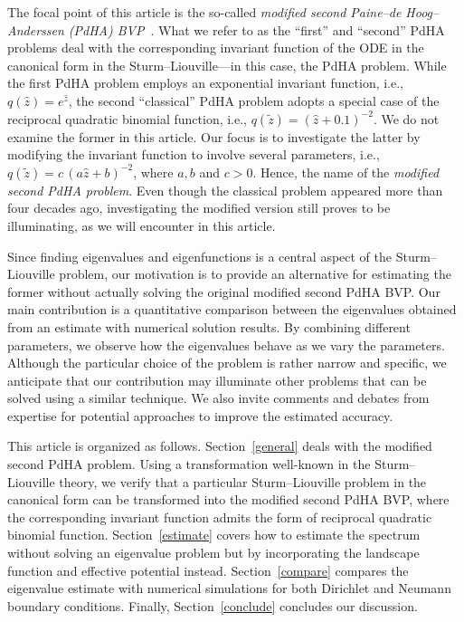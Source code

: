 \documentclass[symmetry,article,accept,moreauthors,pdftex,a4paper]{mdpi}
\begin{document}
The focal point of this article is the so-called \emph{modified second Paine--de Hoog--Anderssen (PdHA) BVP}~\cite{paine1981correction}. What we refer to as the ``first'' and ``second'' PdHA problems deal with the corresponding invariant function of the ODE in the canonical form in the Sturm--Liouville---in this case, the PdHA problem. While the first PdHA problem employs an exponential invariant function, i.e., $q(\widehat{z}) = e^{\widehat{z}}$, the second ``classical'' PdHA problem adopts a special case of the reciprocal quadratic binomial function, i.e., $q(\widetilde{z}) = (\widehat{z} + 0.1)^{-2}$. We do not examine the former in this article. Our focus is to investigate the latter by modifying the invariant function to involve several parameters, i.e., $q(\widetilde{z}) = c \, (a\widehat{z} + b)^{-2}$, where $a, b$ and $c > 0$. Hence, the name of the \emph{modified second PdHA problem}. Even though the classical problem appeared more than four decades ago, investigating the modified version still proves to be illuminating, as we will encounter in this article.

Since finding eigenvalues and eigenfunctions is a central aspect of the Sturm--Liouville problem, our motivation is to provide an alternative for estimating the former without actually solving the original modified second PdHA BVP. Our main contribution is a quantitative comparison between the eigenvalues obtained from an estimate with numerical solution results. By combining different parameters, we observe how the eigenvalues behave as we vary the parameters. Although the particular choice of the problem is rather narrow and specific, we anticipate that our contribution may illuminate other problems that can be solved using a similar technique. We also invite comments and debates from expertise for potential approaches to improve the estimated accuracy.

This article is organized as follows. Section~\ref{general} deals with the modified second PdHA problem. Using a transformation well-known in the Sturm--Liouville theory, we verify that a particular Sturm--Liouville problem in the canonical form can be transformed into the modified second PdHA BVP, where the corresponding invariant function admits the form of reciprocal quadratic binomial function. Section~\ref{estimate} covers how to estimate the spectrum without solving an eigenvalue problem but by incorporating the landscape function and effective potential instead. Section~\ref{compare} compares the eigenvalue estimate with numerical simulations for both Dirichlet and Neumann boundary conditions. Finally, Section~\ref{conclude} concludes our discussion.  
 
\end{document}

